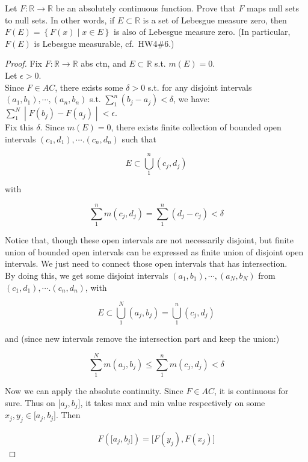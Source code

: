 \documentclass{qlnotes-export}
\begin{document}
Let \(F:{\mathbb{R}}\rightarrow{\mathbb{R}}\) be an absolutely continuous function. Prove that \(F\) maps null sets to null sets. In other words, if \(E \subset {\mathbb{R}}\) is a set of Lebesgue measure zero, then \(F(E) = \left\{ {F(x) \mid x \in E} \right\}\) is also of Lebesgue measure zero. (In particular, \(F(E)\) is Lebesgue measurable, cf.~HW4\#6.)

\begin{proof}

Fix \(F:{\mathbb{R}}\rightarrow{\mathbb{R}}\) abs ctn, and \(E \subset {\mathbb{R}}\) s.t. \(m(E) = 0\).\\
Let \(\epsilon > 0\).\\
Since \(F \in AC\), there exists some \(\delta > 0\) s.t. for any disjoint intervals \((a_{1},b_{1}),\cdots,(a_{n},b_{n})\) s.t. \(\sum_{1}^{n}(b_{j} - a_{j}) < \delta\), we have: \(\left. \sum_{1}^{N} \middle| F(b_{j}) - F(a_{j}) \middle| < \epsilon \right.\).\\
Fix this \(\delta\). Since \(m(E) = 0\), there exists finite collection of bounded open intervals \((c_{1},d_{1}),\cdots.(c_{n},d_{n})\) such that

\[E \subset \bigcup\limits_{1}^{n}(c_{j},d_{j})\]

with

\[\sum\limits_{1}^{n}m(c_{j},d_{j}) = \sum\limits_{1}^{n}(d_{j} - c_{j}) < \delta\]

Notice that, though these open intervals are not necessarily disjoint, but finite union of bounded open intervals can be expressed as finite union of disjoint open intervals. We just need to connect those open intervals that has intersection.\\
By doing this, we get some disjoint intervals \((a_{1},b_{1}),\cdots,(a_{N},b_{N})\) from \((c_{1},d_{1}),\cdots.(c_{n},d_{n})\), with

\[E \subset \bigcup\limits_{1}^{N}(a_{j},b_{j}) = \bigcup\limits_{1}^{n}(c_{j},d_{j})\]

and (since new intervals remove the intersection part and keep the union:)

\[\sum\limits_{1}^{N}m(a_{j},b_{j}) \leq \sum\limits_{1}^{n}m(c_{j},d_{j}) < \delta\]

Now we can apply the absolute continuity. Since \(F \in AC\), it is continuous for sure. Thus on \(\lbrack a_{j},b_{j}\rbrack\), it takes max and min value respectively on some \(x_{j},y_{j} \in \lbrack a_{j},b_{j}\rbrack\). Then

\[F(\lbrack a_{j},b_{j}\rbrack) = \lbrack F(y_{j}),F(x_{j})\rbrack\]


\end{proof}
\end{document}
